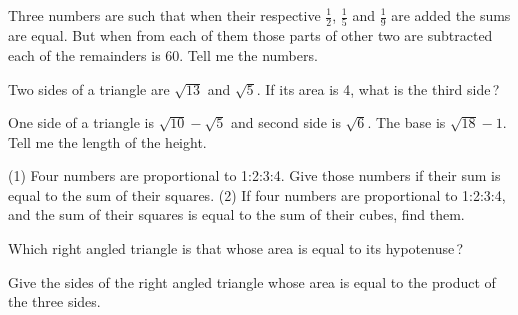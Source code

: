 \documentclass[]{article}
\begin{document}
{{Three numbers are such that when their respective $\frac{1}{2}$, $\frac{1}{5}$ and $\frac{1}{9}$ are
added the sums are equal. But when from each of them those parts of
other two are subtracted each of the remainders is 60. Tell me the
numbers.}

\begin{quote}  {
}  \end{quote}

{Two sides of a triangle are $\sqrt{13}$ and $\sqrt{5}$. If its area is 4, what
is the third side\,?}

\begin{quote}  {
}  \end{quote}

{One side of a triangle is $\sqrt{10} - \sqrt{5}$ and second side is $\sqrt{6}$.
The base is $\sqrt{18} - 1$. Tell me the length of the height.}
\newpage
\large

\begin{quote}  {
}  \end{quote}

(1) Four numbers are proportional to 1:2:3:4. Give those numbers if
their sum is equal to the sum of their squares. (2) If four numbers are
proportional to 1:2:3:4, and the sum of their squares is equal to
the sum of their cubes, find them.

\begin{quote}  {
}  \end{quote}

{Which right angled triangle is that whose area is equal to its
hypotenuse\,?}

{Give the sides of the right angled triangle whose area is equal to the
product of the three sides.}

\begin{quote}  {
}  \end{quote}

}
\end{document}
